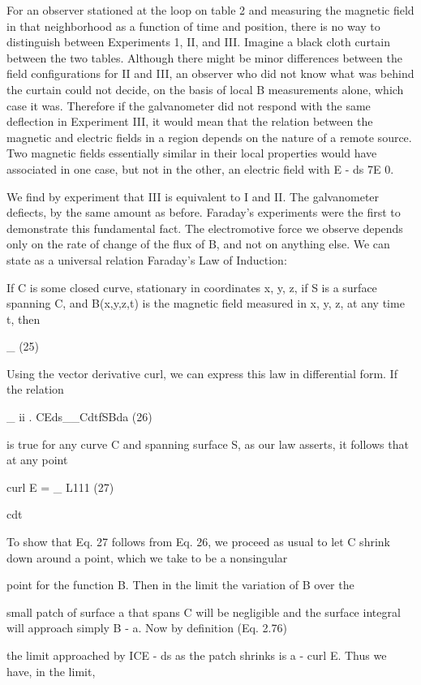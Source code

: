 For an observer stationed at the loop on table 2 and measuring
the magnetic field in that neighborhood as a function of time and
position, there is no way to distinguish between Experiments 1, II,
and III. Imagine a black cloth curtain between the two tables.
Although there might be minor differences between the field configurations
for II and III, an observer who did not know what was
behind the curtain could not decide, on the basis of local B measurements
alone, which case it was. Therefore if the galvanometer did
not respond with the same deflection in Experiment III, it would
mean that the relation between the magnetic and electric fields in a
region depends on the nature of a remote source. Two magnetic
fields essentially similar in their local properties would have associated
in one case, but not in the other, an electric field with
E - ds 7E 0.

We find by experiment that III is equivalent to I and II. The
galvanometer defiects, by the same amount as before. Faraday's
experiments were the first to demonstrate this fundamental fact.
The electromotive force we observe depends only on the rate of
change of the flux of B, and not on anything else. We can state as a
universal relation Faraday's Law of Induction:

If C is some closed curve, stationary in coordinates
x, y, z, if S is a surface spanning C, and B(x,y,z,t) is the
magnetic field measured in x, y, z, at any time t, then

_  (25)

 

Using the vector derivative curl, we can express this law in differential
form. If the relation

_ ii .
CEds__CdtfSBda (26)

is true for any curve C and spanning surface S, as our law asserts, it
follows that at any point

curl E = _ L111 (27)

cdt

To show that Eq. 27 follows from Eq. 26, we proceed as usual to let C
shrink down around a point, which we take to be a nonsingular

point for the function B. Then in the limit the variation of B over the

small patch of surface a that spans C will be negligible and the surface
integral will approach simply B - a. Now by definition (Eq. 2.76)

the limit approached by ICE - ds as the patch shrinks is a - curl E.
Thus we have, in the limit,

